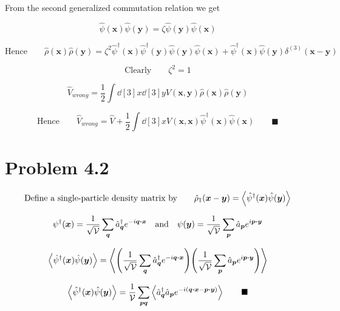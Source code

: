 \documentclass{amsart}
\begin{document}
From the second generalized commutation relation we get

\[  \hat{\psi}(\boldsymbol{x})\hat{\psi}(\boldsymbol{y}) = \zeta \hat{\psi}(\boldsymbol{y})\hat{\psi}(\boldsymbol{x})\]
 
\[ \text{Hence}\qquad \hat{\rho}(\boldsymbol{x})\hat{\rho}(\boldsymbol{y})=
   \zeta^2 \hat{\psi}^\dagger(\boldsymbol{x})
    \hat{\psi}^\dagger(\boldsymbol{y})\hat{\psi}(\boldsymbol{y})\hat{\psi}(\boldsymbol{x}) +\hat{\psi}^\dagger(\boldsymbol{x})\hat{\psi}(\boldsymbol{y})\delta^{(3)}(\boldsymbol{x}-\boldsymbol{y})\] 

\[\text{Clearly}\qquad \zeta^{2}=1 \]

\[ \hat{V}_{wrong} =\frac{1}{2 }\int \dd[3]{x}\dd[3]{y}V(\boldsymbol{x},\boldsymbol{y}) \hat{\rho}(\boldsymbol{x})\hat{\rho}(\boldsymbol{y}) \]

\[ \text{Hence}\qquad \hat{V}_{wrong} =\hat{V}+\frac{1}{2 }\int \dd[3]{x}V(\boldsymbol{x},\boldsymbol{x}) \hat{\psi}^\dagger(\boldsymbol{x})\hat{\psi}(\boldsymbol{x})\qquad\blacksquare
\]


\section*{Problem 4.2}

\[ \text{Define a single-particle density matrix by}\qquad  \hat{\rho}_{1}(\boldsymbol{x}-\boldsymbol{y})=\expval{\hat{\psi}^\dagger(\boldsymbol{x})\hat{\psi}(\boldsymbol{y})}\]

\[ {\psi}^\dagger(\boldsymbol{x})=\frac{1}{\sqrt{\mathcal{V}}} \sum_{\boldsymbol{q}} \hat{a}^{\dagger}_{\boldsymbol{q}}e^{-i\boldsymbol{q}\vdot\boldsymbol{x}} \qq{and}{\psi}(\boldsymbol{y})=\frac{1}{\sqrt{\mathcal{V}}} \sum_{\boldsymbol{p}} \hat{a}_{\boldsymbol{p}}e^{i\boldsymbol{p}\vdot\boldsymbol{y}} \]

\[ \expval{\hat{\psi}^\dagger(\boldsymbol{x})\hat{\psi}(\boldsymbol{y})}=
\expval{\qty(\frac{1}{\sqrt{\mathcal{V}}} \sum_{\boldsymbol{q}} \hat{a}^{\dagger}_{\boldsymbol{q}}e^{-i\boldsymbol{q}\vdot\boldsymbol{x}})\qty(\frac{1}{\sqrt{\mathcal{V}}} \sum_{\boldsymbol{p}} \hat{a}_{\boldsymbol{p}}e^{i\boldsymbol{p}\vdot\boldsymbol{y}} )} \]

\[ \expval{\hat{\psi}^\dagger(\boldsymbol{x})\hat{\psi}(\boldsymbol{y})}=
\frac{1}{\mathcal{V}}\sum_{\boldsymbol{pq}} \expval{ \hat{a}^{\dagger}_{\boldsymbol{q}}\hat{a}_{\boldsymbol{p}}e^{-i(\boldsymbol{q}\vdot\boldsymbol{x}-\boldsymbol{p}\vdot\boldsymbol{y})}} \qquad\blacksquare\]
\end{document}
